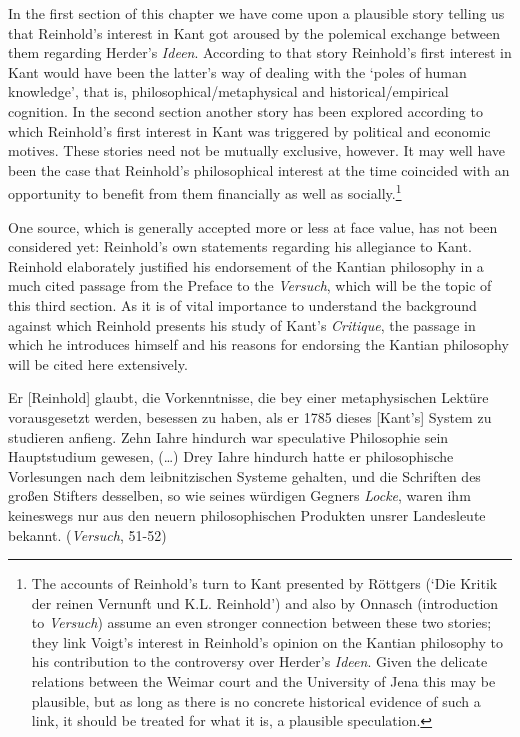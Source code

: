 In the first section of this chapter we have come upon a plausible story telling us that Reinhold's interest in Kant got aroused by the polemical exchange between them regarding Herder's \textit{Ideen}. According to that story Reinhold's first interest in Kant would have been the latter's way of dealing with the `poles of human knowledge', that is, philosophical/metaphysical and historical/empirical cognition. In the second section another story has been explored according to which Reinhold's first interest in Kant was triggered by political and economic motives. These stories need not be mutually exclusive, however. It may well have been the case that Reinhold's philosophical interest at the time coincided with an opportunity to benefit from them financially as well as socially.\footnote{ The accounts of Reinhold's turn to Kant presented by R\"{o}ttgers (`Die Kritik der reinen Vernunft und K.L. Reinhold') and also by Onnasch (introduction to \textit{Versuch}) assume an even stronger connection between these two stories; they link Voigt's interest in Reinhold's opinion on the Kantian philosophy to his contribution to the controversy over Herder's \textit{Ideen}. Given the delicate relations between the Weimar court and the University of Jena this may be plausible, but as long as there is no concrete historical evidence of such a link, it should be treated for what it is, a plausible speculation. } 

 One source, which is generally accepted more or less at face value, has not been considered yet: Reinhold's own statements regarding his allegiance to Kant. Reinhold elaborately justified his endorsement of the Kantian philosophy in a much cited passage from the Preface to the \textit{Versuch}, which will be the topic of this third section. As it is of vital importance to understand the background against which Reinhold presents his study of Kant's \textit{Critique}, the passage in which he introduces himself and his reasons for endorsing the Kantian philosophy will be cited here extensively. 

Er [Reinhold] glaubt, die Vorkenntnisse, die bey einer metaphysischen Lekt\"{u}re vorausgesetzt werden, besessen zu haben, als er 1785 dieses [Kant's] System zu studieren anfieng. Zehn Iahre hindurch war speculative Philosophie sein Hauptstudium gewesen, (\ldots ) Drey Iahre hindurch hatte er philosophische Vorlesungen nach dem leibnitzischen Systeme gehalten, und die Schriften des gro\ss{}en Stifters desselben, so wie seines w\"{u}rdigen Gegners \textit{Locke}, waren ihm keineswegs nur aus den neuern philosophischen Produkten unsrer Landesleute bekannt. (\textit{Versuch}, 51{-}52)

